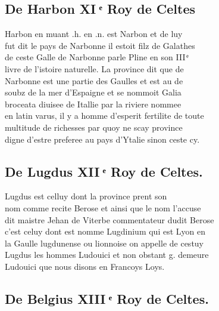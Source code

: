\documentclass[12pt]{article}
\begin{document}
\newpage






\subsection*{De Harbon XI ͤ Roy de
          Celtes}


Harbon en muant .h. en .n. est Narbon et de
            luy\\
fut dit le pays de Narbonne il estoit filz de Galathes\\
de ceste Galle de Narbonne parle Pline en son III ͤ\\
livre de l'istoire naturelle. La province dit que de\\
Narbonne est une partie des Gaulles et est au de\\
soubz de la mer
          d'Espaigne et se nommoit Galia\\
broceata diuisee de Itallie par la riviere
            nommee\\
en latin varus, il y a homme d'esperit fertilite de toute\\
multitude de richesses par quoy ne scay province\\
digne d'estre preferee au
          pays d'Ytalie sinon ceste cy.





\subsection*{De Lugdus XII ͤ Roy de
          Celtes.}


Lugdus est celluy dont la province prent
            son\\
nom comme recite Berose et ainsi que le
          nom l'accuse\\
dit maistre Jehan de Viterbe
          commentateur dudit Berose\\
c'est celuy dont est
          nomme Lugdinium qui est Lyon en\\
la Gaulle lugdunense ou lionnoise on appelle de
            cestuy\\
Lugdus les hommes Ludouici et non
          obstant g. demeure\\
Ludouici que nous disons en Francoys Loys.





\subsection*{De Belgius XIII ͤ Roy de Celtes.}
\end{document}
